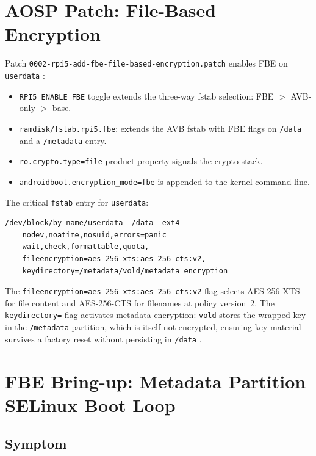 \section{AOSP Patch: File-Based Encryption}
\label{sec:impl_fbe}

Patch \texttt{0002-rpi5-add-fbe-file-based-encryption.patch} enables FBE on \texttt{userdata} \cite{android_fbe}:

\begin{itemize}
    \item \texttt{RPI5\_ENABLE\_FBE} toggle extends the three-way fstab selection: FBE $>$ AVB-only $>$ base.
    \item \texttt{ramdisk/fstab.rpi5.fbe}: extends the AVB fstab with FBE flags on \texttt{/data} and a \texttt{/metadata} entry.
    \item \texttt{ro.crypto.type=file} product property signals the crypto stack.
    \item \texttt{androidboot.encryption\_mode=fbe} is appended to the kernel command line.
\end{itemize}

The critical \texttt{fstab} entry for \texttt{userdata}:

\begin{lstlisting}[caption={fstab.rpi5.fbe --- userdata entry (FBE + metadata encryption)}]
/dev/block/by-name/userdata  /data  ext4
    nodev,noatime,nosuid,errors=panic
    wait,check,formattable,quota,
    fileencryption=aes-256-xts:aes-256-cts:v2,
    keydirectory=/metadata/vold/metadata_encryption
\end{lstlisting}

The \texttt{fileencryption=aes-256-xts:aes-256-cts:v2} flag selects AES-256-XTS for file content and AES-256-CTS for filenames at policy version~2. The \texttt{keydirectory=} flag activates metadata encryption: \texttt{vold} stores the wrapped key in the \texttt{/metadata} partition, which is itself not encrypted, ensuring key material survives a factory reset without persisting in \texttt{/data} \cite{android_data_encryption}.

\section{FBE Bring-up: Metadata Partition SELinux Boot Loop}
\label{sec:impl_fbe_selinux}

\subsection{Symptom}

